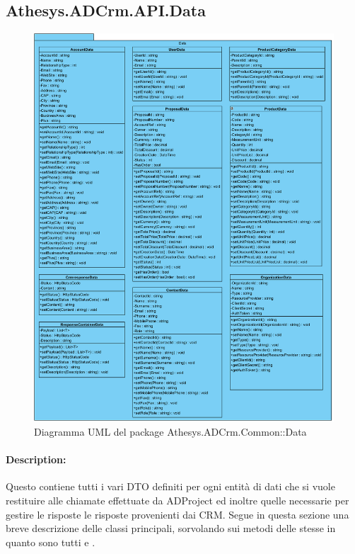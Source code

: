 \subsection{Athesys.ADCrm.API.Data}
\begin{figure}[H]
	\centering
	\includegraphics[width=\linewidth]{images/modules/Data}
	\caption{Diagramma UML del package Athesys.ADCrm.Common::Data}
	\label{fig:data}
\end{figure}
\paragraph{Description:}
Questo  contiene tutti i vari DTO definiti per ogni entità di dati che si vuole restituire alle chiamate effettuate da ADProject ed inoltre quelle necessarie per gestire le risposte le risposte provenienti dai CRM. 
Segue in questa sezione una breve descrizione delle classi principali, sorvolando sui metodi delle stesse in quanto sono tutti   e .


